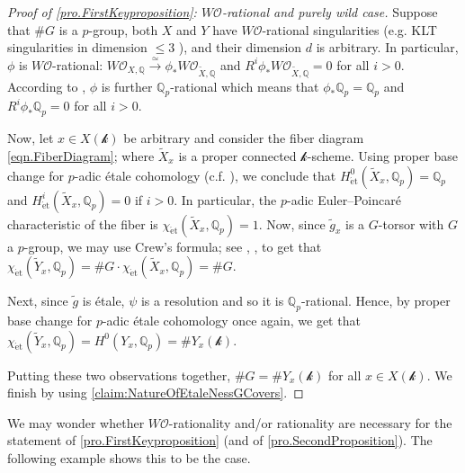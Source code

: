 \documentclass[12pt]{amsart}
\theoremstyle{plain}   %
\theoremstyle{definition}    %
\theoremstyle{remark}    %
\numberwithin{equation}{theorem}
\newcommand{\kay}{\mathcal{k}}
\newcommand{\sO}{\mathcal{O}}
\newcommand{\bQ}{\mathbb{Q}}
\begin{document}
\begin{proof}[Proof of \autoref{pro.FirstKeyproposition}: $W\sO$-rational and purely wild case]
Suppose that $\#G$ is a $p$-group, both $X$ and $Y$ have $W\sO$-rational singularities (e.g. KLT singularities in dimension $\leq 3$ \cite{HaconWitaszekMMPLowCharacteristic,GongyoNakamuraTanakaRationalPointsFanoThreefoldsFiniteFields}), and their dimension $d$ is arbitrary. In particular, $\phi$ is $W\sO$-rational: $W\sO_{X,\bQ} \xrightarrow{\simeq} \phi_*W\sO_{\tilde{X},\bQ}$ and $R^i\phi_*W\sO_{\tilde{X},\bQ} = 0$ for all $i>0$. According to \cite[Lemma 3.19]{PatakfalviZdanowiczOrdinaryVarietiesTrivialCanoniucalNOtUniruled}, $\phi$ is further $\bQ_p$-rational which means that $\phi_*\bQ_p=\bQ_p$ and $R^i \phi_* \bQ_p=0$ for all $i>0$. 

Now, let $x \in X(\kay)$ be arbitrary and consider the fiber diagram \autoref{eqn.FiberDiagram}; where $\tilde{X}_x$ is a proper connected $\kay$-scheme. Using proper base change for $p$-adic \'etale cohomology \cite[Proposition 3.16]{PatakfalviZdanowiczOrdinaryVarietiesTrivialCanoniucalNOtUniruled} (c.f. \cite[Expos\'e VI, 2.2.3 B]{SGA5}), we conclude that $H^0_\mathrm{\acute{e}t}(\tilde{X}_x, \bQ_p)= \bQ_p$ and $H^i_{\mathrm{\acute{e}t}}(\tilde{X}_x, \bQ_p)= 0$ if $i>0$. In particular, the $p$-adic Euler--Poincar\'e characteristic of the fiber is $\chi_{\mathrm{\acute{e}t}}(\tilde{X}_x, \bQ_p) = 1$. Now, since $\tilde{g}_x$ is a $G$-torsor with $G$ a $p$-group, we may use Crew's formula; see \cite{CrewPCoversInCharacteristicP}, \cite[Lemma 8.5]{Chambert-LoirPointsRationnels}, to get that $\chi_{\mathrm{\acute{e}t}}(\tilde{Y}_x,\bQ_p) = \# G \cdot \chi_{\mathrm{\acute{e}t}}(\tilde{X}_x,\bQ_p) = \# G$.

Next, since $\tilde{g}$ is \'etale, $\psi$ is a resolution and so it is $\bQ_p$-rational. Hence, by proper base change for $p$-adic \'etale cohomology once again, we get that $\chi_{\mathrm{\acute{e}t}}(\tilde{Y}_x,\bQ_p)= H^0(Y_x,\bQ_p) = \#Y_x(\kay)$. 

Putting these two observations together, $\# G = \#Y_x(\kay)$ for all $x \in X(\kay)$. We finish by using \autoref{claim:NatureOfEtaleNessGCovers}.
\end{proof}

We may wonder whether $W\sO$-rationality and/or rationality are necessary for the statement of \autoref{pro.FirstKeyproposition} (and of \autoref{pro.SecondProposition}). The following example shows this to be the case.
\end{document}

